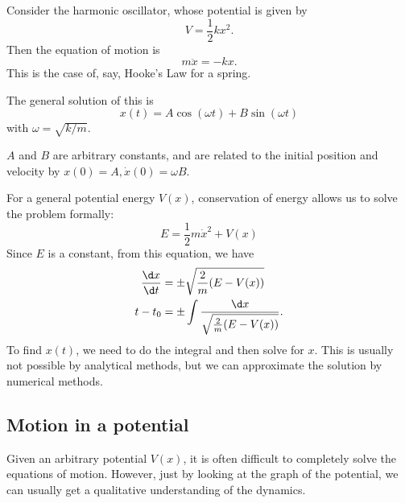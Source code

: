 \documentclass[a4paper]{article}
\begin{document}
\begin{eg}
  Consider the harmonic oscillator, whose potential is given by
  \[
    V = \frac{1}{2} kx^2.
  \]
  Then the equation of motion is
  \[
    m\ddot{x} = -kx.
  \]
  This is the case of, say, Hooke's Law for a spring.

  The general solution of this is
  \[
    x(t) = A\cos (\omega t) + B\sin (\omega t)
  \]
  with $\omega = \sqrt{k/m}$.

  $A$ and $B$ are arbitrary constants, and are related to the initial position and velocity by $x(0) = A, \dot{x}(0) = \omega B$.
\end{eg}
For a general potential energy $V(x)$, conservation of energy allows us to solve the problem formally:
\[
  E = \frac{1}{2}m\dot{x}^2 + V(x)
\]
Since $E$ is a constant, from this equation, we have
\begin{align*}
  \frac{\d x}{\d t} &= \pm \sqrt{\frac{2}{m}(E - V(x))}\\
  t - t_0 &= \pm \int \frac{\d x}{\sqrt{\frac{2}{m}(E - V(x))}}.
\end{align*}
To find $x(t)$, we need to do the integral and then solve for $x$. This is usually not possible by analytical methods, but we can approximate the solution by numerical methods.

\subsection{Motion in a potential}
Given an arbitrary potential $V(x)$, it is often difficult to completely solve the equations of motion. However, just by looking at the graph of the potential, we can usually get a qualitative understanding of the dynamics.
\end{document}
